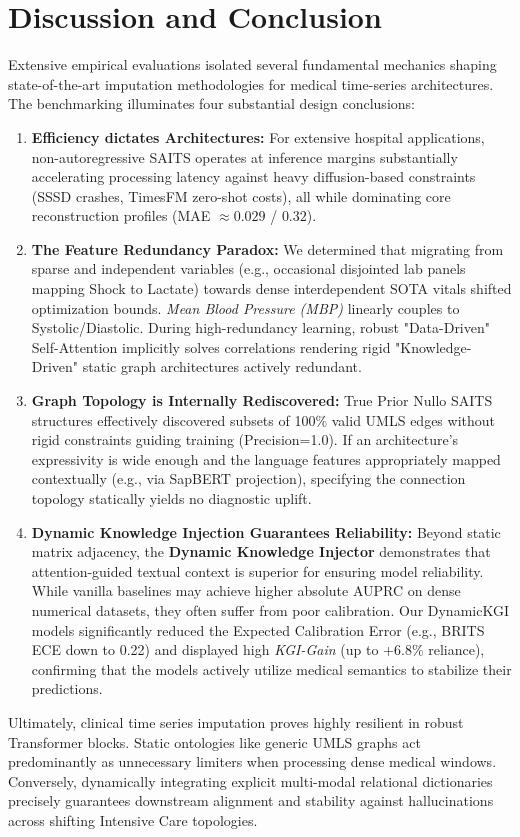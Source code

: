\section{Discussion and Conclusion}
\label{sec:discussion}

Extensive empirical evaluations isolated several fundamental mechanics shaping state-of-the-art imputation methodologies for medical time-series architectures. The benchmarking illuminates four substantial design conclusions:

\begin{enumerate}
    \item \textbf{Efficiency dictates Architectures:} For extensive hospital applications, non-autoregressive SAITS operates at inference margins substantially accelerating processing latency against heavy diffusion-based constraints (SSSD crashes, TimesFM zero-shot costs), all while dominating core reconstruction profiles (MAE $\approx 0.029$ / $0.32$).
    
    \item \textbf{The Feature Redundancy Paradox:} We determined that migrating from sparse and independent variables (e.g., occasional disjointed lab panels mapping Shock to Lactate) towards dense interdependent SOTA vitals shifted optimization bounds. \textit{Mean Blood Pressure (MBP)} linearly couples to Systolic/Diastolic. During high-redundancy learning, robust "Data-Driven" Self-Attention implicitly solves correlations rendering rigid "Knowledge-Driven" static graph architectures actively redundant.
    
    \item \textbf{Graph Topology is Internally Rediscovered:} True Prior Nullo SAITS structures effectively discovered subsets of 100\% valid UMLS edges without rigid constraints guiding training (Precision=1.0). If an architecture's expressivity is wide enough and the language features appropriately mapped contextually (e.g., via SapBERT projection), specifying the connection topology statically yields no diagnostic uplift. 
    
    \item \textbf{Dynamic Knowledge Injection Guarantees Reliability:} Beyond static matrix adjacency, the \textbf{Dynamic Knowledge Injector} demonstrates that attention-guided textual context is superior for ensuring model reliability. While vanilla baselines may achieve higher absolute AUPRC on dense numerical datasets, they often suffer from poor calibration. Our DynamicKGI models significantly reduced the Expected Calibration Error (e.g., BRITS ECE down to 0.22) and displayed high \textit{KGI-Gain} (up to +6.8\% reliance), confirming that the models actively utilize medical semantics to stabilize their predictions.
\end{enumerate}

Ultimately, clinical time series imputation proves highly resilient in robust Transformer blocks. Static ontologies like generic UMLS graphs act predominantly as unnecessary limiters when processing dense medical windows. Conversely, dynamically integrating explicit multi-modal relational dictionaries precisely guarantees downstream alignment and stability against hallucinations across shifting Intensive Care topologies.
